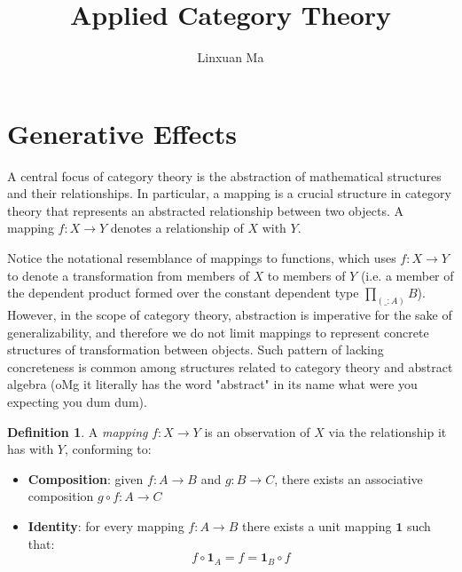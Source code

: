 \documentclass[12pt]{article}
\title{Applied Category Theory}
\author{Linxuan Ma}
\theoremstyle{definition}
\newtheorem{defn}{Definition}[section]
\begin{document}
	\maketitle
	
	
	\section{Generative Effects}
	
	A central focus of category theory is the abstraction of mathematical structures and their relationships. In particular, a mapping is a crucial structure in category theory that represents an abstracted relationship between two objects. A mapping $f: X \to Y$ denotes a relationship of $X$ with $Y$.
	
	Notice the notational resemblance of mappings to functions, which uses $f: X \to Y$ to denote a transformation from members of $X$ to members of $Y$ (i.e. a member of the dependent product formed over the constant dependent type $\prod_{(\_:A)}B$). However, in the scope of category theory, abstraction is imperative for the sake of generalizability, and therefore we do not limit mappings to represent concrete structures of transformation between objects. Such pattern of lacking concreteness is common among structures related to category theory and abstract algebra (oMg it literally has the word "abstract" in its name what were you expecting you dum dum).
	
	\begin{defn}
		A \emph{mapping} $f: X \to Y$ is an observation of $X$ via the relationship it has with $Y$, conforming to:
		\begin{itemize}
			\item \textbf{Composition}: given $f: A \to B$ and $g: B \to C$, there exists an associative composition $g \circ f: A \to C$
			\item \textbf{Identity}: for every mapping $f: A \to B$ there exists a unit mapping $\textbf{1}$ such that: $$f \circ \textbf{1}_A = f = \textbf{1}_B \circ f$$
		\end{itemize}
	\end{defn}
	
\end{document}
